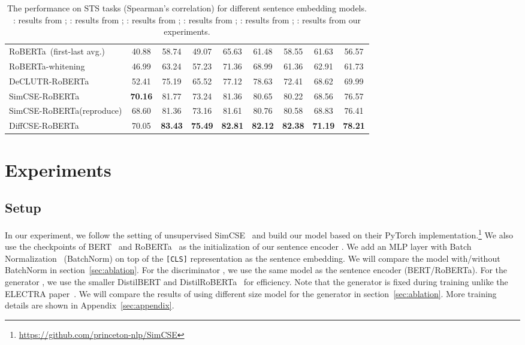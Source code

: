 \documentclass[11pt]{article}
\newcommand{\ba}{\xspace}
\begin{document}
\begin{table*}[th!]
\begin{center}
\begin{tabular}{lcccccccc}
        \midrule
        RoBERTa\ba~(first-last avg.) & 40.88&	58.74&	49.07&	65.63&	61.48&	58.55&	61.63&	56.57\\
        RoBERTa\ba-whitening & 46.99& 63.24&	57.23&	71.36&	68.99&	61.36&	62.91& 61.73\\ 
        DeCLUTR-RoBERTa\ba & 52.41 & 75.19& 65.52 & 77.12 & 78.63 & 72.41 &  68.62  & 69.99\\
        SimCSE-RoBERTa\ba &  \bf 70.16  & 81.77 	& 73.24 	& 81.36 	& 80.65 	& 80.22 	&	68.56 &  76.57 \\
         SimCSE-RoBERTa\ba {\scriptsize(reproduce)} &  68.60 & 81.36 & 73.16 & 81.61 & 80.76 & 80.58 & 68.83 & 76.41 \\
         DiffCSE-RoBERTa\ba & 70.05 & \bf 83.43 & \bf 75.49 & \bf 82.81 & \bf 82.12 & \bf 82.38 & \bf 71.19 & \bf 78.21 \\
    \bottomrule
    \end{tabular}
    \end{center}
\vspace{-3.5mm}
    \caption{
        The performance on STS tasks (Spearman's correlation) for different sentence embedding models.
        : results from \citet{reimers2019sentence};
        : results from \citet{zhang2020unsupervised};
        : results from \citet{gao2021simcse};
        : results from \citet{yang2020universal};
        : results from \citet{kim2021self};
        : results from our experiments.
    }
    \label{tab:main_sts}
\vspace{-2mm}
\end{table*} 
\section{Experiments}
\label{sec:exp}
\subsection{Setup}
In our experiment, we follow the setting of unsupervised SimCSE~\cite{gao2021simcse} and build our model based on their PyTorch implementation.\footnote{\label{github}\scriptsize \url{https://github.com/princeton-nlp/SimCSE}} We also use the checkpoints of BERT~\cite{devlin2019bert} and RoBERTa~\cite{liu2019roberta} as the initialization of our sentence encoder . We add an MLP layer with Batch Normalization~\cite{ioffe2015batch} (BatchNorm) on top of the \texttt{[CLS]} representation as the sentence embedding. We will compare the model with/without BatchNorm in section~\ref{sec:ablation}. For the discriminator , we use the same model as the sentence encoder  (BERT/RoBERTa). For the generator , we use the smaller DistilBERT and DistilRoBERTa~\cite{sanh2019distilbert} for efficiency. Note that the generator is fixed during training unlike the ELECTRA paper~\cite{clark2020electra}. We will compare the results of using different size model for the generator in section~\ref{sec:ablation}. More training details are shown in Appendix~\ref{sec:appendix}.
\end{document}
